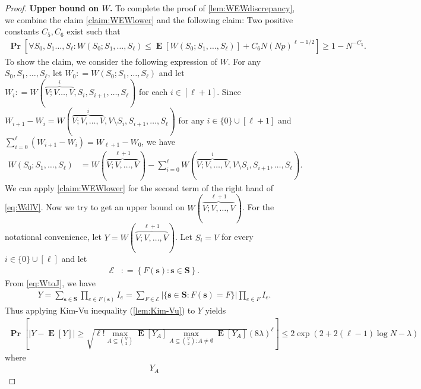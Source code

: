 \documentclass[letterpaper,11pt]{article}
\newcommand{\Ind}{I}
\newcommand{\Vsize}{N}
\newcommand{\pmax}{p}
\newcommand{\Slc}{\mathbf{S}}
\newcommand{\Es}{F}
\renewcommand\Pr{\mathop{\mathbf{Pr}}}
\DeclareMathOperator{\E}{\mathbf{E}}
\def\defeq{\mathrel{\mathop:}=}%
\begin{document}
\begin{proof}
\noindent \textbf{Upper bound on $W$. }
To complete the proof of \cref{lem:WEWdiscrepancy}, we combine the claim \cref{claim:WEWlower} and  the following claim:
Two positive constants $C_5, C_6$ exist such that
\begin{align}
\Pr\left[\forall S_0, S_1\ldots, S_\ell: W(S_0;S_1,\ldots, S_\ell)\leq \E[W(S_0;S_1,\ldots, S_\ell)]+C_6 \Vsize (\Vsize \pmax)^{\ell-1/2}  \right]\geq 1-\Vsize^{-C_5}.
\label{claim:WEWupper}
\end{align}
To show the claim, we consider the following expression of $W$.
For any $S_0, S_1, \ldots, S_\ell$, let 
$W_0\defeq W(S_0;S_1,\ldots,S_\ell)$ and
let 
$W_i\defeq W(\overbrace{V; V\ldots, V}^{i}, S_{i}, S_{i+1}, \ldots, S_{\ell})$ for each $i\in[\ell+1]$.
Since $W_{i+1}-W_{i}=W(\overbrace{V;V,\ldots,V}^{i},V\setminus S_{i}, S_{i+1}, \ldots, S_{\ell})$ for any $i\in \{0\}\cup [\ell+1]$
and $\sum_{i=0}^{\ell}(W_{i+1}-W_{i})=W_{\ell+1}-W_0$, we have
\begin{align}
\label{eq:WdlV}
W(S_0;S_1,\ldots,S_{\ell})&=W(\overbrace{V;V,\ldots,V}^{\ell+1})-\sum_{i=0}^{\ell}W(\overbrace{V;V,\ldots,V}^{i},V\setminus S_{i}, S_{i+1}, \ldots, S_{\ell}).
\end{align}
We can apply \cref{claim:WEWlower} for the second term of the right hand of \cref{eq:WdlV}. 
Now we try to get an upper bound on $W(\overbrace{V;V,\ldots,V}^{\ell+1})$. %
For the notational convenience, let $Y=W(\overbrace{V;V,\ldots,V}^{\ell+1})$.
%
Let $S_i=V$ for every $i\in \{0\}\cup [\ell]$ and let 
\begin{align*}
\mathcal{E}&\defeq \left\{\Es(\mathbf{s}): \mathbf{s}\in \Slc\right\}.
\end{align*}
From \eqref{eq:WtoJ}, we have
\begin{align*}
Y
=\sum_{\mathbf{s}\in \Slc}\prod_{e\in \Es(\mathbf{s})}\Ind_e
=\sum_{\Es\in \mathcal{E}} |\{\mathbf{s}\in \Slc : \Es(\mathbf{s})=F\}|\prod_{e\in \Es}\Ind_e.
\end{align*}
Thus applying Kim-Vu inequality (\cref{lem:Kim-Vu}) to $Y$ yields
\begin{align}
\Pr\left[|Y-\E[Y]|\geq \sqrt{\ell! \max_{A\subseteq \binom{V}{2}}\E[Y_{A}]\max_{A\subseteq \binom{V}{2}:A\neq \emptyset}\E[Y_{A}]}(8\lambda)^\ell\right]\leq 2\exp(2+2(\ell-1)\log \Vsize-\lambda)
\label{eq:KimVutoY}
\end{align}
where
\begin{align*}
Y_{A}

\end{align*}
\end{proof}
\end{document}
